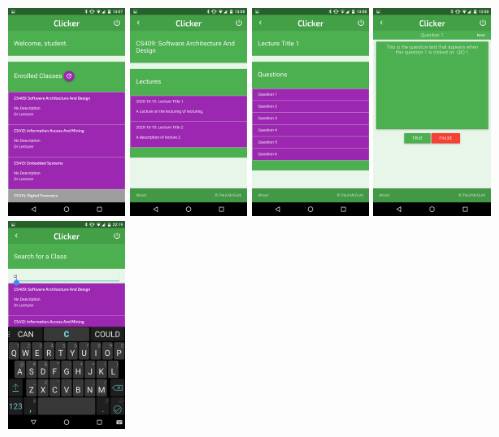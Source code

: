\documentclass{article}
\begin{document}
\begin{center}
\includegraphics[width=3.1cm]{images/studenthome.png}
\includegraphics[width=3.1cm]{images/studentlectures.png}
\includegraphics[width=3.1cm]{images/studentquestions.png}
\includegraphics[width=3.1cm]{images/studentquestion.png}
\includegraphics[width=3.1cm]{images/03021602.png}
\end{center}
\end{document}
